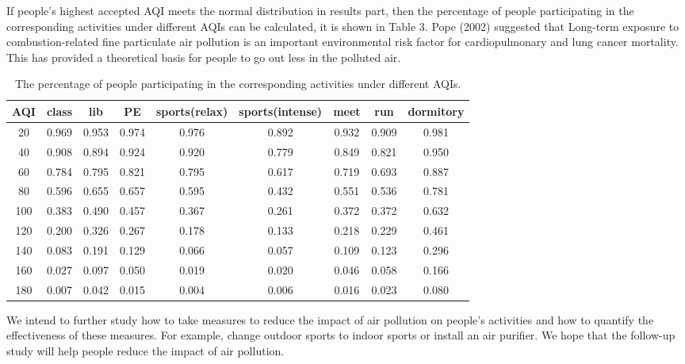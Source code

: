 If people's highest accepted AQI meets the normal distribution in results part, then the percentage of people participating in the corresponding activities under different AQIs can be calculated, it is shown in Table 3. Pope (2002) suggested that Long-term exposure to combustion-related fine particulate air pollution is an important environmental risk factor for cardiopulmonary and lung cancer mortality. This has provided a theoretical basis for people to go out less in the polluted air.

\begin{table}
\centering
\caption{The percentage of people participating in the corresponding activities under different AQIs.}
\begin{tabular}{c|c|c|c|c|c|c|c|c}
AQI & class & lib & PE & sports(relax) & sports(intense) & meet & run & dormitory \\
\hline
20 & 0.969 & 0.953 & 0.974 & 0.976 & 0.892 & 0.932 & 0.909 & 0.981 \\
40 & 0.908 & 0.894 & 0.924 & 0.920 & 0.779 & 0.849 & 0.821 & 0.950 \\
60 & 0.784 & 0.795 & 0.821 & 0.795 & 0.617 & 0.719 & 0.693 & 0.887 \\
80&0.596 & 0.655 & 0.657 & 0.595 & 0.432 & 0.551 & 0.536 & 0.781 \\
100&0.383 & 0.490 & 0.457 & 0.367 & 0.261 & 0.372 & 0.372 & 0.632 \\
120&0.200 & 0.326 & 0.267 & 0.178 & 0.133 & 0.218 & 0.229 & 0.461 \\
140&0.083 & 0.191 & 0.129 & 0.066 & 0.057 & 0.109 & 0.123 & 0.296 \\
160&0.027 & 0.097 & 0.050 & 0.019 & 0.020 & 0.046 & 0.058 & 0.166 \\
180&0.007 & 0.042 & 0.015 & 0.004 & 0.006 & 0.016 & 0.023 & 0.080

\end{tabular}
\end{table}


We intend to further study how to take measures to reduce the impact of air pollution on people's activities and how to quantify the effectiveness of these measures. For example, change outdoor sports to indoor sports or install an air purifier. We hope that the follow-up study will help people reduce the impact of air pollution.

